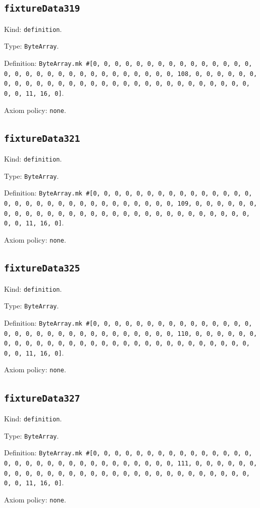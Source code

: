 \documentclass[11pt]{article}
\begin{document}
\subsection*{\texttt{fixtureData319}}
\noindent Kind: \texttt{definition}.\par
\noindent Type: \texttt{ByteArray}.\par
\noindent Definition: \texttt{ByteArray.mk \#[0, 0, 0, 0, 0, 0, 0, 0, 0, 0, 0, 0, 0, 0, 0, 0, 0, 0, 0, 0, 0, 0, 0, 0, 0, 0, 0, 0, 0, 0, 0, 108, 0, 0, 0, 0, 0, 0, 0, 0, 0, 0, 0, 0, 0, 0, 0, 0, 0, 0, 0, 0, 0, 0, 0, 0, 0, 0, 0, 0, 0, 0, 0, 11, 16, 0]}.\par
\noindent Axiom policy: \texttt{none}.\par
\subsection*{\texttt{fixtureData321}}
\noindent Kind: \texttt{definition}.\par
\noindent Type: \texttt{ByteArray}.\par
\noindent Definition: \texttt{ByteArray.mk \#[0, 0, 0, 0, 0, 0, 0, 0, 0, 0, 0, 0, 0, 0, 0, 0, 0, 0, 0, 0, 0, 0, 0, 0, 0, 0, 0, 0, 0, 0, 0, 109, 0, 0, 0, 0, 0, 0, 0, 0, 0, 0, 0, 0, 0, 0, 0, 0, 0, 0, 0, 0, 0, 0, 0, 0, 0, 0, 0, 0, 0, 0, 0, 11, 16, 0]}.\par
\noindent Axiom policy: \texttt{none}.\par
\subsection*{\texttt{fixtureData325}}
\noindent Kind: \texttt{definition}.\par
\noindent Type: \texttt{ByteArray}.\par
\noindent Definition: \texttt{ByteArray.mk \#[0, 0, 0, 0, 0, 0, 0, 0, 0, 0, 0, 0, 0, 0, 0, 0, 0, 0, 0, 0, 0, 0, 0, 0, 0, 0, 0, 0, 0, 0, 0, 110, 0, 0, 0, 0, 0, 0, 0, 0, 0, 0, 0, 0, 0, 0, 0, 0, 0, 0, 0, 0, 0, 0, 0, 0, 0, 0, 0, 0, 0, 0, 0, 11, 16, 0]}.\par
\noindent Axiom policy: \texttt{none}.\par
\subsection*{\texttt{fixtureData327}}
\noindent Kind: \texttt{definition}.\par
\noindent Type: \texttt{ByteArray}.\par
\noindent Definition: \texttt{ByteArray.mk \#[0, 0, 0, 0, 0, 0, 0, 0, 0, 0, 0, 0, 0, 0, 0, 0, 0, 0, 0, 0, 0, 0, 0, 0, 0, 0, 0, 0, 0, 0, 0, 111, 0, 0, 0, 0, 0, 0, 0, 0, 0, 0, 0, 0, 0, 0, 0, 0, 0, 0, 0, 0, 0, 0, 0, 0, 0, 0, 0, 0, 0, 0, 0, 11, 16, 0]}.\par
\noindent Axiom policy: \texttt{none}.\par
\end{document}
